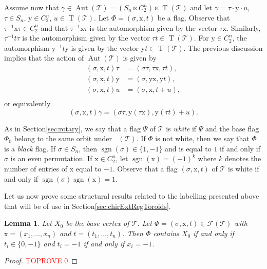 \documentclass[final]{amsart}
\theoremstyle{plain}
\newtheorem{lem}[thm]{Lemma}
\theoremstyle{definition}
\theoremstyle{remark}
\numberwithin{equation}{section}
\renewcommand{\{}{\lbrace}
\renewcommand{\}}{\rbrace}
\newcommand{\cF}{\mathcal{F}}
\newcommand{\cT}{\mathcal{T}}
\newcommand{\cyvec}[1]{{\mathrm{#1}}}
\newcommand{\vx}{\cyvec{x}}
\newcommand{\vy}{\cyvec{y}}
\DeclareMathOperator{\sgn}{sgn}
\DeclareMathOperator{\aut}{Aut} \DeclareMathOperator{\autp}{\aut^{+}}
\newcommand{\cyctwo}[1][n]{ C_{2}^{#1} }
\DeclareMathOperator{\tras}{T}
\begin{document}
Assume now that $ \gamma \in \aut(\cT) = (S_{n} \ltimes \cyctwo) \ltimes \tras (\cT)$ and let $\gamma = \tau \cdot \vy \cdot u$, $\tau \in S_n$, $\vy \in \cyctwo$, $u \in \tras(\cT)$.
Let $\Phi = (\sigma, \vx, t)$ be a flag. 
Observe that $\tau^{-1} \vx \tau \in \cyctwo$ and that $\tau^{-1} \vx \tau$ is the automorphism given by the vector $\tau \vx$. 
Similarly, $\tau^{-1} t \tau$ is the automorphism given by the vector $\tau t \in \tras (\cT)$. 
For $\vy \in \cyctwo$, the automorphism $\vy^{-1} t \vy$ is given by the vector $\vy t \in \tras (\cT) $. 
The previous discussion implies that the action of $\aut(\cT)$ is given by
\begin{equation}\label{eq:autOnLabels_s}
  \begin{aligned}
    (\sigma, \vx, t) \tau &= (\sigma \tau, \tau \vx, \tau t),\\
    (\sigma, \vx, t) \vy &= (\sigma, \vy \vx, \vy t), \\
    (\sigma, \vx, t) u &= (\sigma, \vx, t + u), \\
  \end{aligned}
\end{equation}
or equivalently 
\begin{equation}\label{eq:autOnLabels}
(\sigma, \vx, t)\gamma = (\sigma \tau , \vy(\tau \vx),\vy(\tau t) + u ).
\end{equation}

As in Section\nobreakspace \ref {sec:rotary}, we  say that a flag $\Psi$ of $\cT$ is \emph{white} if $\Psi$  and the base flag $\Phi_{0}$ belong to the same orbit under $\autp(\cT)$. 
If $\Phi$ is not white, then we say that $\Phi$ is a \emph{black} flag.  
If $\sigma \in S_{n}$, then $\sgn(\sigma)\in \{1,-1\}$ and is equal to $1$ if and only if $\sigma$ is an even permutation. 
If $\vx \in \cyctwo$, let $\sgn(\vx) = (-1)^{k}$ where $k$ denotes the number of entries of $\vx$ equal to $-1$. 
Observe that a flag $(\sigma, \vx, t)$ of $\cT$ is white if and only if $\sgn(\sigma)\sgn(\vx) = 1$.

Let us now prove some structural results related to the labelling presented above that will be of use in Section\nobreakspace \ref {sec:chirExtRegToroids}.

\begin{lem}\label{lem:flagsAroundX0} 
  Let $X_{0}$ be the base vertex of $\cT$. 
  Let $\Phi = (\sigma, \vx, t) \in  \cF(\cT)$ with $\vx=(x_{1}, \dots, x_{n})$ and $t= (t_{1}, \dots, t_{n})$. 
  Then $\Phi$ contains $X_{0}$ if and only if $t_i \in \{0,-1\} $ and $t_i = -1$ if and only if $x_i = -1$.
\end{lem}
  \begin{proof}\textcolor{red}{TOPROVE 0}\end{proof}
\end{document}
